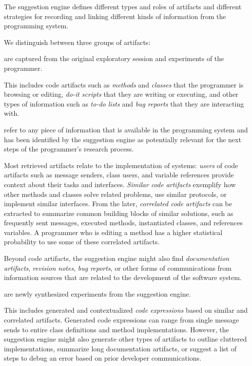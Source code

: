 The suggestion engine defines different types and roles of artifacts and different strategies for recording and linking different kinds of information from the programming system.

We distinguish between three groups of artifacts:

\begin{description}[noextralabelsep]
	\item[Input artifacts] are captured from the original exploratory session and experiments of the programmer.

	This includes code artifacts such as \emph{methods} and \emph{classes} that the programmer is browsing or editing, \emph{do-it scripts} that they are writing or executing, and other types of information such as \emph{to-do lists} and \emph{bug reports} that they are interacting with.

	\item[Retrieved artifacts] refer to any piece of information that is available in the programming system and has been identified by the suggestion engine as potentially relevant for the next steps of the programmer's research process.

	Most retrieved artifacts relate to the implementation of systems: \emph{users} of code artifacts such as message senders, class users, and variable references provide context about their tasks and interfaces.
	\emph{Similar code artifacts} exemplify how other methods and classes solve related problems, use similar protocols, or implement similar interfaces.
	From the later, \emph{correlated code artifacts} can be extracted to summarize common building blocks of similar solutions, such as frequently sent messages, executed methods, instantiated classes, and references variables.
	A programmer who is editing a method has a higher statistical probability to use some of these correlated artifacts.

	Beyond code artifacts, the suggestion engine might also find \emph{documentation artifacts}, \emph{revision notes}, \emph{bug reports}, or other forms of communications from information sources that are related to the development of the software system.

	\item[Generated artifacts] are newly synthesized experiments from the suggestion engine.

	This includes generated and contextualized \emph{code expressions} based on similar and correlated artifacts.
	Generated code expressions can range from single message sends to entire class definitions and method implementations.
	However, the suggestion engine might also generate other types of artifacts to outline cluttered implementations, summarize long documentation artifacts, or suggest a list of steps to debug an error based on prior developer communications.
\end{description}


